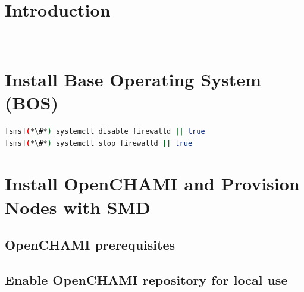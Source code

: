 \documentclass[letterpaper]{article}
\newcommand{\OpenCHAMI}{OpenCHAMI}
\begin{document}
\graphicspath{{common/figures/}}
\thispagestyle{empty}




\newpage
\tableofcontents
\newpage


\section{Introduction} \label{sec:introduction}

 \\









\section{Install Base Operating System (BOS)}


\begin{lstlisting}[language=bash,keywords={}]
[sms](*\#*) systemctl disable firewalld || true
[sms](*\#*) systemctl stop firewalld || true
\end{lstlisting}


\section{Install \OpenCHAMI{} and Provision Nodes with SMD}\label{sec:provision_compute_bos}


\subsection{\OpenCHAMI{} prerequisites}\label{sec:openchami_prerequisites}


\subsection{Enable \OpenCHAMI{} repository for local use}\label{sec:enable_openchami}

\end{document}
